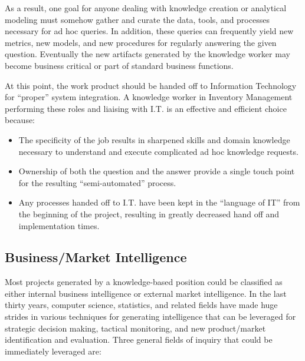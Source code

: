 \documentclass[10pt,journal,compsoc]{IEEEtran}
\begin{document}
    As a result, one goal for anyone dealing with knowledge creation or analytical
    modeling must somehow gather and curate the data, tools, and processes necessary
    for ad hoc queries.  In addition, these queries can frequently yield new
    metrics, new models, and new procedures for regularly answering the given
    question.  Eventually the new artifacts generated by the knowledge
    worker may become business critical or part of standard business functions.

    At this point, the work product should be handed off to Information Technology
    for ``proper'' system integration.  A knowledge worker in Inventory
    Management performing these roles and liaising with I.T. is an effective
    and efficient choice because:

    \begin{itemize}
        \item The specificity of the job results in sharpened skills and domain
        knowledge necessary to understand and execute complicated ad hoc knowledge
        requests.

        \item Ownership of both the question and the answer provide a single touch
        point for the resulting ``semi-automated'' process.

        \item Any processes handed off to I.T. have been kept in the ``language
        of IT'' from the beginning of the project, resulting in greatly decreased
        hand off and implementation times.
    \end{itemize}

    \subsection{Business/Market Intelligence}

    Most projects generated by a knowledge-based position could be classified
    as either internal business intelligence or external market intelligence.
    In the last thirty years, computer science, statistics, and related fields
    have made huge strides in various techniques for generating intelligence
    that can be leveraged for strategic decision making, tactical monitoring,
    and new product/market identification and evaluation.  Three general
    fields of inquiry that could be immediately leveraged are:
\end{document}
